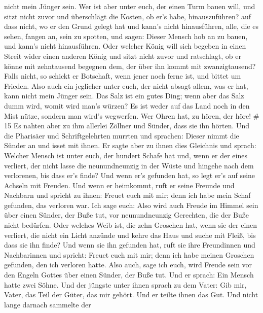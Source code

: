 nicht mein Jünger sein.  Wer ist aber unter euch, der einen
Turm bauen will, und sitzt nicht zuvor und überschlägt die Kosten, ob
er's habe, hinauszuführen?  auf dass nicht, wo er den Grund
gelegt hat und kann's nicht hinausführen, alle, die es sehen, fangen an,
sein zu spotten,  und sagen: Dieser Mensch hob an zu bauen,
und kann's nicht hinausführen.  Oder welcher König will
sich begeben in einen Streit wider einen anderen König und sitzt nicht
zuvor und ratschlagt, ob er könne mit zehntausend begegnen dem, der über
ihn kommt mit zwanzigtausend?  Falls nicht, so schickt er
Botschaft, wenn jener noch ferne ist, und bittet um Frieden.
 Also auch ein jeglicher unter euch, der nicht absagt
allem, was er hat, kann nicht mein Jünger sein.  Das Salz
ist ein gutes Ding; wenn aber das Salz dumm wird, womit wird man's
würzen?  Es ist weder auf das Land noch in den Mist nütze,
sondern man wird's wegwerfen. Wer Ohren hat, zu hören, der höre! \# 15
 Es nahten aber zu ihm allerlei Zöllner und Sünder, dass sie
ihn hörten.  Und die Pharisäer und Schriftgelehrten murrten
und sprachen: Dieser nimmt die Sünder an und isset mit ihnen.
 Er sagte aber zu ihnen dies Gleichnis und sprach:
 Welcher Mensch ist unter euch, der hundert Schafe hat und,
wenn er der eines verliert, der nicht lasse die neunundneunzig in der
Wüste und hingehe nach dem verlorenen, bis dass er's finde? 
Und wenn er's gefunden hat, so legt er's auf seine Achseln mit Freuden.
 Und wenn er heimkommt, ruft er seine Freunde und Nachbarn
und spricht zu ihnen: Freuet euch mit mir; denn ich habe mein Schaf
gefunden, das verloren war.  Ich sage euch: Also wird auch
Freude im Himmel sein über einen Sünder, der Buße tut, vor
neunundneunzig Gerechten, die der Buße nicht bedürfen.  Oder
welches Weib ist, die zehn Groschen hat, wenn sie der einen verliert,
die nicht ein Licht anzünde und kehre das Haus und suche mit Fleiß, bis
dass sie ihn finde?  Und wenn sie ihn gefunden hat, ruft sie
ihre Freundinnen und Nachbarinnen und spricht: Freuet euch mit mir; denn
ich habe meinen Groschen gefunden, den ich verloren hatte. 
Also auch, sage ich euch, wird Freude sein vor den Engeln Gottes über
einen Sünder, der Buße tut.  Und er sprach: Ein Mensch
hatte zwei Söhne.  Und der jüngste unter ihnen sprach zu
dem Vater: Gib mir, Vater, das Teil der Güter, das mir gehört. Und er
teilte ihnen das Gut.  Und nicht lange darnach sammelte der
